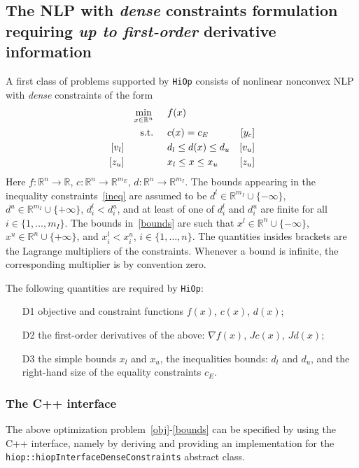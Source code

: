 \documentclass[11pt]{article}
\newcounter{line}
\newcommand{\Hi}{\texttt{HiOp}\xspace}
\begin{document}
\subsection{The NLP with \textit{dense} constraints formulation requiring \textit{up to first-order} derivative information}
A first class of problems supported by \Hi consists of nonlinear nonconvex NLP with \textit{dense} constraints of the form
\begin{align}
&&&&\min_{x\in\mathbb{R}^n} & \hspace{0.5cm} f(x) &&&& \label{obj}\\
&&&&\textnormal{s.t.} &\hspace{0.5cm}  c(x)=c_E &[y_c]&&&\\
&&[v_l]&&& \hspace{0.5cm} d_l \leq d(x) \leq d_u  &[v_u]&&&\label{ineq} \\
&&[z_u]&&& \hspace{0.5cm} x_l \leq x \leq x_u & [z_u] &&&\label{bounds}
\end{align}
Here $f:\mathbb{R}^n\rightarrow\mathbb{R}$, $c:\mathbb{R}^n\rightarrow\mathbb{R}^{m_E}$, $d:\mathbb{R}^n\rightarrow\mathbb{R}^{m_I}$. The bounds appearing in the inequality constraints~\eqref{ineq} are assumed to be $d^l\in\mathbb{R}^{m_I}\cup\{-\infty\}$, $d^u\in\mathbb{R}^{m_I}\cup\{+\infty\}$, $d_i^l < d_i^u$, and at least of one of $d_i^l$ and $d_i^u$ are finite for all $i\in\{1,\ldots,m_I\}$. The bounds in~\eqref{bounds} are such that $x^l\in\mathbb{R}^{n}\cup\{-\infty\}$, $x^u\in\mathbb{R}^{n}\cup\{+\infty\}$, and $x_i^l < x_i^u$, $i\in\{1,\ldots,n\}$. The quantities insides brackets are the Lagrange multipliers of the constraints. Whenever a bound is infinite, the corresponding multiplier is by convention zero.

The following quantities are required by \Hi:
\begin{itemize}
\item[D1] objective and constraint functions $f(x)$, $c(x)$, $d(x)$;
\item[D2] the first-order derivatives of the above: $\nabla f(x)$, $Jc(x)$, $Jd(x)$;
\item[D3] the simple bounds $x_l$ and $x_u$, the inequalities bounds: $d_l$ and $d_u$, and the right-hand size of the equality constraints $c_E$.
\end{itemize}

\subsubsection{The C++ interface}
The above optimization problem~\eqref{obj}-\eqref{bounds} can be specified by using the C++ interface, namely by deriving and providing an implementation for the \texttt{hiop::hiopInterfaceDenseConstraints} abstract class.
\end{document}

